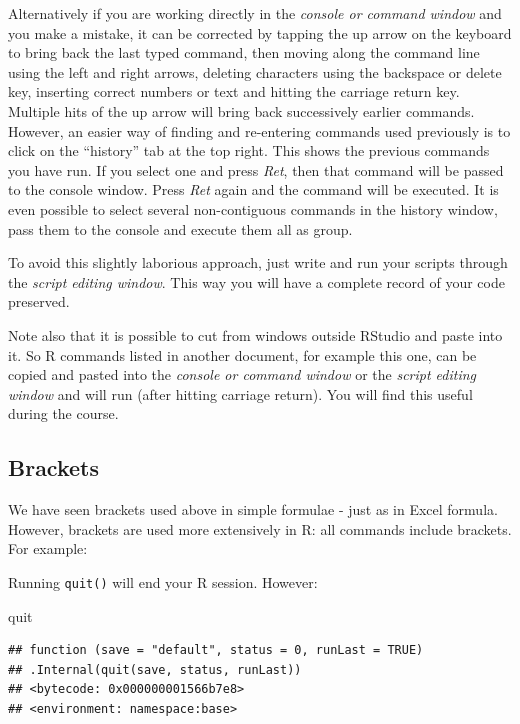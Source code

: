 \documentclass[
]{book}
\makeatletter
\newenvironment{Shaded}{\begin{snugshade}}{\end{snugshade}}
\newcommand{\NormalTok}[1]{#1}
\newenvironment{kframe}{%
\medskip{}
\setlength{\fboxsep}{.8em}
 \def\at@end@of@kframe{}%
 \ifinner\ifhmode%
  \def\at@end@of@kframe{\end{minipage}}%
  \begin{minipage}{\columnwidth}%
 \fi\fi%
 \def\FrameCommand##1{\hskip\@totalleftmargin \hskip-\fboxsep
 \colorbox{shadecolor}{##1}\hskip-\fboxsep
     \hskip-\linewidth \hskip-\@totalleftmargin \hskip\columnwidth}%
 \MakeFramed {\advance\hsize-\width
   \@totalleftmargin\z@ \linewidth\hsize
   \@setminipage}}%
 {\par\unskip\endMakeFramed%
 \at@end@of@kframe}
\newenvironment{rmdblock}[1]
  {
  \begin{itemize}
  \renewcommand{\labelitemi}{
    \raisebox{-.7\height}[0pt][0pt]{
      {\setkeys{Gin}{width=3em,keepaspectratio}\texttt{[image: images/\#1]}}
    }
  }
  \setlength{\fboxsep}{1em}
  \begin{kframe}
  \item
  }
  {
  \end{kframe}
  \end{itemize}
  }
\newenvironment{rmdnote}
  {\begin{rmdblock}{note}}
  {\end{rmdblock}}
\makeatother
\begin{document}
Alternatively if you are working directly in the \emph{console or command window} and you make a mistake, it can be corrected by tapping the up arrow on the keyboard to bring back the last typed command, then moving along the command line using the left and right arrows, deleting characters using the backspace or delete key, inserting correct numbers or text and hitting the carriage return key. Multiple hits of the up arrow will bring back successively earlier commands. However, an easier way of finding and re-entering commands used previously is to click on the ``history'' tab at the top right. This shows the previous commands you have run. If you select one and press \emph{Ret}, then that command will be passed to the console window. Press \emph{Ret} again and the command will be executed. It is even possible to select several non-contiguous commands in the history window, pass them to the console and execute them all as group.

To avoid this slightly laborious approach, just write and run your scripts through the \emph{script editing window}. This way you will have a complete record of your code preserved.

\begin{rmdnote}
Note also that it is possible to cut from windows outside RStudio and paste into it. So R commands listed in another document, for example this one, can be copied and pasted into the \emph{console or command window} or the \emph{script editing window} and will run (after hitting carriage return). You will find this useful during the course.
\end{rmdnote}

\hypertarget{brackets}{%
\subsection{Brackets}\label{brackets}}

We have seen brackets used above in simple formulae - just as in Excel formula. However, brackets are used more extensively in R: all commands include brackets. For example:

Running \texttt{quit()} will end your R session. However:

\begin{Shaded}
\begin{Highlighting}[]
\NormalTok{quit}
\end{Highlighting}
\end{Shaded}

\begin{verbatim}
## function (save = "default", status = 0, runLast = TRUE) 
## .Internal(quit(save, status, runLast))
## <bytecode: 0x000000001566b7e8>
## <environment: namespace:base>
\end{verbatim}
\end{document}
